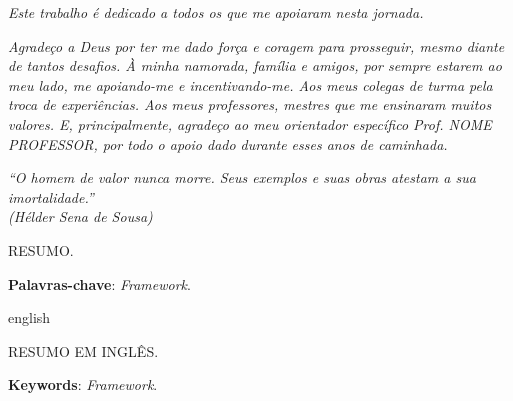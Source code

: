 \documentclass[12pt,oneside,a4paper,english,french,spanish]{univille-brasil-abntex2}
\begin{document}

\begin{dedicatoria}
   \vspace*{\fill}
   \centering
   \noindent
   \textit{ Este trabalho é dedicado a todos os que me apoiaram nesta jornada. } \vspace*{\fill}
\end{dedicatoria}

\begin{agradecimentos}

	\vfill
	
	\begin{flushright}
		\parbox{8cm}{
	\textit{ Agradeço a Deus por ter me dado força e coragem para prosseguir, mesmo diante de tantos desafios. À minha namorada, família e amigos, por sempre estarem ao meu lado, me apoiando-me e incentivando-me. Aos meus colegas de turma pela troca de  experiências. Aos meus professores, mestres que me ensinaram muitos valores. E, principalmente, agradeço ao meu orientador específico Prof. NOME PROFESSOR, por todo o apoio dado durante esses anos de caminhada.
	}}
	\end{flushright}
	
\end{agradecimentos}

\begin{epigrafe}
    \vspace*{\fill}
	\begin{flushright}
		\textit{``O homem de valor nunca morre. Seus exemplos e suas obras atestam a sua imortalidade.''\\
		(Hélder Sena de Sousa)}
	\end{flushright}
\end{epigrafe}


%
\begin{resumo}
% 
	\noindent
	RESUMO.

%
 \vspace{\onelineskip}
%    
 \noindent
 \textbf{Palavras-chave}: \textit{Framework}.
\end{resumo}

\begin{resumo}[Abstract]
 \begin{otherlanguage*}{english}
	 
     \noindent
	 RESUMO EM INGLÊS.
    
	
   \vspace{\onelineskip}
 
   \noindent 
   \textbf{Keywords}: \textit{Framework}.
 \end{otherlanguage*}
\end{resumo}
\end{document}
